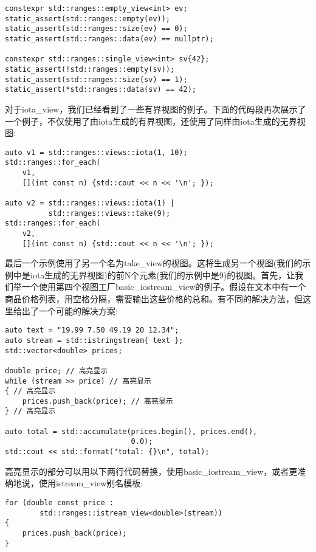 \begin{lstlisting}[style=styleCXX]
constexpr std::ranges::empty_view<int> ev;
static_assert(std::ranges::empty(ev));
static_assert(std::ranges::size(ev) == 0);
static_assert(std::ranges::data(ev) == nullptr);

constexpr std::ranges::single_view<int> sv{42};
static_assert(!std::ranges::empty(sv));
static_assert(std::ranges::size(sv) == 1);
static_assert(*std::ranges::data(sv) == 42);
\end{lstlisting}

对于iota\_view，我们已经看到了一些有界视图的例子。下面的代码段再次展示了一个例子，不仅使用了由iota生成的有界视图，还使用了同样由iota生成的无界视图:

\begin{lstlisting}[style=styleCXX]
auto v1 = std::ranges::views::iota(1, 10);
std::ranges::for_each(
	v1,
	[](int const n) {std::cout << n << '\n'; });
	
auto v2 = std::ranges::views::iota(1) |
		  std::ranges::views::take(9);
std::ranges::for_each(
	v2,
	[](int const n) {std::cout << n << '\n'; });
\end{lstlisting}

最后一个示例使用了另一个名为take\_view的视图。这将生成另一个视图(我们的示例中是iota生成的无界视图)的前N个元素(我们的示例中是9)的视图。首先，让我们举一个使用第四个视图工厂basic\_iostream\_view的例子。假设在文本中有一个商品价格列表，用空格分隔，需要输出这些价格的总和。有不同的解决方法，但这里给出了一个可能的解决方案:

\begin{lstlisting}[style=styleCXX]
auto text = "19.99 7.50 49.19 20 12.34";
auto stream = std::istringstream{ text };
std::vector<double> prices;

double price; // 高亮显示
while (stream >> price) // 高亮显示
{ // 高亮显示
	prices.push_back(price); // 高亮显示
} // 高亮显示

auto total = std::accumulate(prices.begin(), prices.end(),
							 0.0);
std::cout << std::format("total: {}\n", total);
\end{lstlisting}

高亮显示的部分可以用以下两行代码替换，使用basic\_iostream\_view，或者更准确地说，使用istream\_view别名模板:

\begin{lstlisting}[style=styleCXX]
for (double const price :
		std::ranges::istream_view<double>(stream))
{
	prices.push_back(price);
}
\end{lstlisting}

